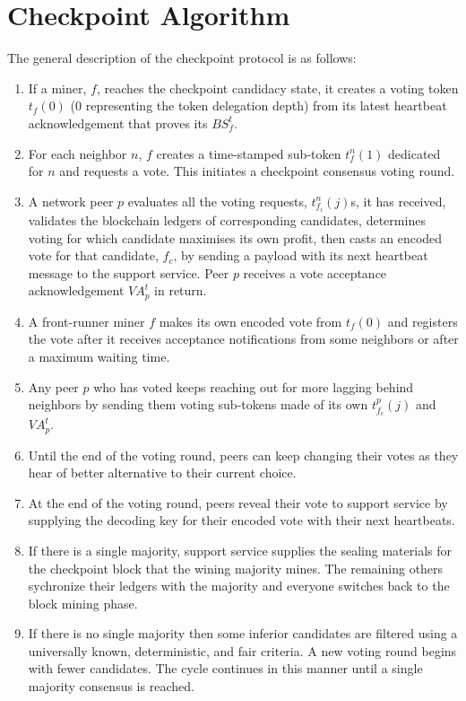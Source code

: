 \documentclass[conference]{IEEEtran}
\begin{document}


    



\section{Checkpoint Algorithm}
\label{s-algorithm}
The general description of the checkpoint protocol is as follows:
\begin{enumerate}
\item If a miner, $f$, reaches the checkpoint candidacy state, it creates a voting token $t_f(0)$ (0 representing the token delegation depth) from its latest heartbeat acknowledgement that proves its  $BS_f^t$.
\item For each neighbor $n$, $f$ creates a time-stamped sub-token $t_f^{n}(1)$ dedicated for $n$ and requests a vote. This initiates a checkpoint consensus voting round.
\item A network peer $p$ evaluates all the voting requests, $t_{f_i}^{n}(j)$s, it has received, validates the blockchain ledgers of corresponding candidates, determines voting for which candidate maximises its own profit, then casts an encoded vote for that candidate, $f_c$, by sending a payload with its next heartbeat message to the support service. Peer $p$ receives a vote acceptance acknowledgement $VA_p^t$ in return.
\item A front-runner miner $f$ makes its own encoded vote from $t_f(0)$ and registers the vote after it receives acceptance notifications from some neighbors or after a maximum waiting time.
\item Any peer $p$ who has voted keeps reaching out for more lagging behind neighbors by sending them voting sub-tokens made of its own $t_{f_c}^{p}(j)$ and $VA_p^t$.
\item Until the end of the voting round, peers can keep changing their votes as they hear of better alternative to their current choice.   
\item At the end of the voting round, peers reveal their vote to support service by supplying the decoding key for their encoded vote with their next heartbeats.
\item If there is a single majority, support service supplies the sealing materials for the checkpoint block that the wining majority mines. The remaining others sychronize their ledgers with the majority and everyone switches back to the block mining phase.
\item If there is no single majority then some inferior candidates are filtered using a universally known, deterministic, and fair criteria. A new voting round begins with fewer candidates. The cycle continues in this manner until a single majority consensus is reached.                              
\end{enumerate} 
\end{document}
